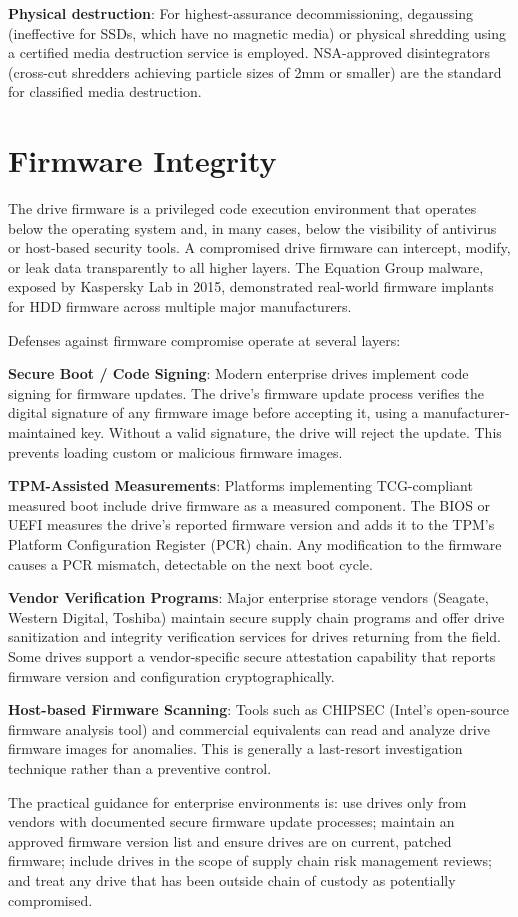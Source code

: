 \textbf{Physical destruction}: For highest-assurance decommissioning, degaussing (ineffective for SSDs, which have no magnetic media) or physical shredding using a certified media destruction service is employed. NSA-approved disintegrators (cross-cut shredders achieving particle sizes of 2mm or smaller) are the standard for classified media destruction.

\section{Firmware Integrity}
The drive firmware is a privileged code execution environment that operates below the operating system and, in many cases, below the visibility of antivirus or host-based security tools. A compromised drive firmware can intercept, modify, or leak data transparently to all higher layers. The Equation Group malware, exposed by Kaspersky Lab in 2015, demonstrated real-world firmware implants for HDD firmware across multiple major manufacturers.

Defenses against firmware compromise operate at several layers:

\textbf{Secure Boot / Code Signing}: Modern enterprise drives implement code signing for firmware updates. The drive's firmware update process verifies the digital signature of any firmware image before accepting it, using a manufacturer-maintained key. Without a valid signature, the drive will reject the update. This prevents loading custom or malicious firmware images.

\textbf{TPM-Assisted Measurements}: Platforms implementing TCG-compliant measured boot include drive firmware as a measured component. The BIOS or UEFI measures the drive's reported firmware version and adds it to the TPM's Platform Configuration Register (PCR) chain. Any modification to the firmware causes a PCR mismatch, detectable on the next boot cycle.

\textbf{Vendor Verification Programs}: Major enterprise storage vendors (Seagate, Western Digital, Toshiba) maintain secure supply chain programs and offer drive sanitization and integrity verification services for drives returning from the field. Some drives support a vendor-specific secure attestation capability that reports firmware version and configuration cryptographically.

\textbf{Host-based Firmware Scanning}: Tools such as CHIPSEC (Intel's open-source firmware analysis tool) and commercial equivalents can read and analyze drive firmware images for anomalies. This is generally a last-resort investigation technique rather than a preventive control.

The practical guidance for enterprise environments is: use drives only from vendors with documented secure firmware update processes; maintain an approved firmware version list and ensure drives are on current, patched firmware; include drives in the scope of supply chain risk management reviews; and treat any drive that has been outside chain of custody as potentially compromised.
